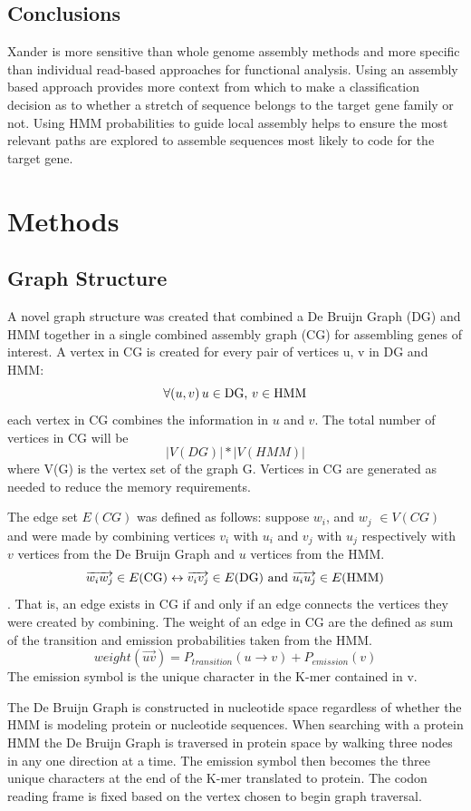 \documentclass[10pt]{bmc_article}
\newenvironment{bmcformat}{\begin{raggedright}\baselineskip20pt\sloppy\setboolean{publ}{false}}{\end{raggedright}\baselineskip20pt\sloppy}
\begin{document}
\begin{bmcformat}
\subsection*{Conclusions}
Xander is more sensitive than whole genome assembly methods and more specific than individual read-based approaches for functional analysis.  Using an assembly based approach provides more context from which to make a classification decision as to whether a stretch of sequence belongs to the target gene family or not.  Using HMM probabilities to guide local assembly helps to ensure the most relevant paths are explored to assemble sequences most likely to code for the target gene.
  
\section*{Methods}
\subsection*{Graph Structure}
A novel graph structure was created that combined a De Bruijn Graph (DG) and HMM together in a single combined assembly graph (CG) for assembling genes of interest.  A vertex in CG is created for every pair of vertices u, v in DG and HMM:
\[ \forall (u,v)\, u\in \textnormal{DG, }v\in \textnormal{HMM} \] each vertex in CG combines the information in $u$ and $v$.
The total number of vertices in CG will be \[|V(DG)| * |V(HMM)|\] where V(G) is the vertex set of the graph G.  Vertices in CG are generated as needed to reduce the memory requirements.

The edge set $E(CG)$ was defined as follows: suppose $w_i$, and $w_j$ \(\in V(CG) \) and were made by combining vertices $v_i$ with $u_i$ and $v_j$ with $u_j$ respectively with $v$ vertices from the De Bruijn Graph and $u$ vertices from the HMM.
\[\overrightarrow{w_iw_j} \in E(\textnormal{CG}) \leftrightarrow \overrightarrow{v_iv_j} \in E(\textnormal{DG})\textnormal{ and } \overrightarrow{u_iu_j} \in E(\textnormal{HMM})\].
That is, an edge exists in CG if and only if an edge connects the vertices they were created by combining. The weight of an edge  in CG are the defined as sum of the transition and emission probabilities taken from the HMM.  
\[ weight(\overrightarrow{uv}) = P_{transition}(u \rightarrow v) + P_{emission}(v) \]
The emission symbol is the unique character in the K-mer contained in v.

The De Bruijn Graph is constructed in nucleotide space regardless of whether the HMM is modeling protein or nucleotide sequences. When searching with a protein HMM the De Bruijn Graph is traversed in protein space by walking three nodes in any one direction at a time.  The emission symbol then becomes the three unique characters at the end of the K-mer translated to protein.  The codon reading frame is fixed based on the vertex chosen to begin graph traversal.


\end{bmcformat}
\end{document}
